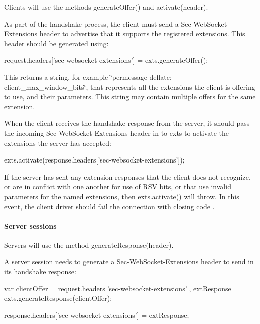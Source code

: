 Clients will use the methods {\ttfamily generate\+Offer()} and {\ttfamily activate(header)}.

As part of the handshake process, the client must send a {\ttfamily Sec-\/\+Web\+Socket-\/\+Extensions} header to advertise that it supports the registered extensions. This header should be generated using\+:


\begin{DoxyCode}
request.headers['sec-websocket-extensions'] = exts.generateOffer();
\end{DoxyCode}


This returns a string, for example {\ttfamily \char`\"{}permessage-\/deflate;
client\+\_\+max\+\_\+window\+\_\+bits\char`\"{}}, that represents all the extensions the client is offering to use, and their parameters. This string may contain multiple offers for the same extension.

When the client receives the handshake response from the server, it should pass the incoming {\ttfamily Sec-\/\+Web\+Socket-\/\+Extensions} header in to {\ttfamily exts} to activate the extensions the server has accepted\+:


\begin{DoxyCode}
exts.activate(response.headers['sec-websocket-extensions']);
\end{DoxyCode}


If the server has sent any extension responses that the client does not recognize, or are in conflict with one another for use of R\+SV bits, or that use invalid parameters for the named extensions, then {\ttfamily exts.\+activate()} will {\ttfamily throw}. In this event, the client driver should fail the connection with closing code {}.

\paragraph*{Server sessions}

Servers will use the method {\ttfamily generate\+Response(header)}.

A server session needs to generate a {\ttfamily Sec-\/\+Web\+Socket-\/\+Extensions} header to send in its handshake response\+:


\begin{DoxyCode}
var clientOffer = request.headers['sec-websocket-extensions'],
    extResponse = exts.generateResponse(clientOffer);

response.headers['sec-websocket-extensions'] = extResponse;
\end{DoxyCode}


